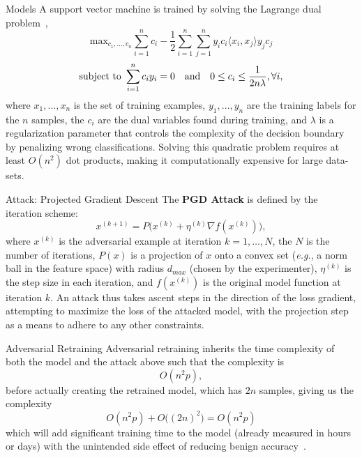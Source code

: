 \documentclass{beamer}
\begin{document}
\begin{frame}{Models}
    A support vector machine is trained by solving the Lagrange dual problem~\cite{cortes1995support},
\begin{equation}
    \textrm{max}_{c_1,\ldots,c_n}
    \sum_{i = 1}^n c_i - \frac{1}{2} \sum_{i = 1}^n \sum_{j = 1}^n y_i c_i \langle x_i, x_j \rangle y_j c_j
    \label{eq:linear_svm}
\end{equation}
$$
    \textrm{subject to } \sum_{i = 1}^n c_i y_i = 0 \textrm{\quad and\quad} 0 \leq c_i \leq \frac{1}{2n\lambda}, \forall i,
$$
where $x_1,\ldots,x_n$ is the set of training examples, $y_1,\ldots,y_n$ are the training labels for the $n$ samples, the $c_i$ are the dual variables found during training, and $\lambda$ is a regularization parameter that controls the complexity of the decision boundary by penalizing wrong classifications. Solving this quadratic problem requires at least $O(n^2)$ dot products, making it computationally expensive for large data-sets.
\end{frame}

\begin{frame}{Attack: Projected Gradient Descent}
The \textbf{PGD Attack} is defined by the iteration scheme:
$$
    x^{(k+1)} = P\big(x^{(k)} + \eta^{(k)} \nabla f(x^{(k)})\big),
$$
where $x^{(k)}$ is the adversarial example at iteration $k = 1,\ldots,N$, the $N$ is the number of iterations, $P(x)$ is a projection of $x$ onto a convex set (\textit{e.g.}, a norm ball in the feature space) with radius $d_{max}$ (chosen by the experimenter), $\eta^{(k)}$ is the step size in each iteration, and $f(x^{(k)})$ is the original model function at iteration $k$. An attack thus takes ascent steps in the direction of the loss gradient, attempting to maximize the loss of the attacked model, with the projection step as a means to adhere to any other constraints.
\end{frame}

\begin{frame}{Adversarial Retraining}
    Adversarial retraining inherits the time complexity of both the model and the attack above such that the complexity is
$$
    O(n^2p),
$$
before actually creating the retrained model, which has $2n$ samples, giving us the complexity
$$
    O(n^2p) + O\big((2n)^2\big) = O(n^2p)
$$
which will add significant training time to the model (already measured in hours or days) with the unintended side effect of reducing benign accuracy~\cite{stutz2019confidence}.
\end{frame}
\end{document}
